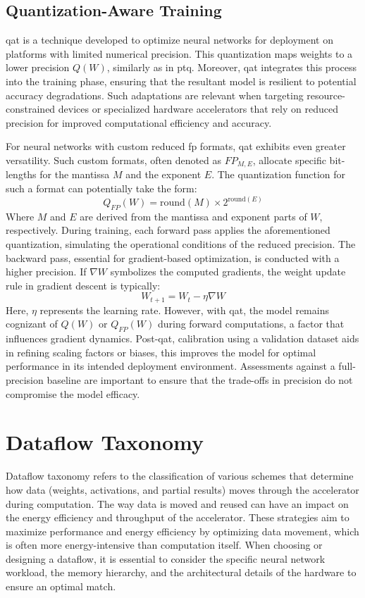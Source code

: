 \subsection{Quantization-Aware Training}

\gls{qat} is a technique developed to optimize neural networks for deployment on platforms with limited numerical precision. This quantization maps weights to a lower precision \( Q(W) \), similarly as in \gls{ptq}. Moreover, \gls{qat} integrates this process into the training phase, ensuring that the resultant model is resilient to potential accuracy degradations. Such adaptations are relevant when targeting resource-constrained devices or specialized hardware accelerators that rely on reduced precision for improved computational efficiency and accuracy.

For neural networks with custom reduced \gls{fp} formats, \gls{qat} exhibits even greater versatility. Such custom formats, often denoted as \( FP_{M,E} \), allocate specific bit-lengths for the mantissa \( M \) and the exponent \( E \). The quantization function for such a format can potentially take the form:
\begin{equation}
Q_{FP}(W) = \text{round}\left(M\right) \times 2^{\text{round}\left(E\right)}
\end{equation}
Where \( M \) and \( E \) are derived from the mantissa and exponent parts of \( W \), respectively.
During training, each forward pass applies the aforementioned quantization, simulating the operational conditions of the reduced precision. The backward pass, essential for gradient-based optimization, is conducted with a higher precision. If \( \nabla W \) symbolizes the computed gradients, the weight update rule in gradient descent is typically:
\begin{equation}
W_{t+1} = W_t - \eta \nabla W
\end{equation}
Here, \( \eta \) represents the learning rate. However, with \gls{qat}, the model remains cognizant of \( Q(W) \) or \( Q_{FP}(W) \) during forward computations, a factor that influences gradient dynamics. Post-\gls{qat}, calibration using a validation dataset aids in refining scaling factors or biases, this improves the model for optimal performance in its intended deployment environment. Assessments against a full-precision baseline are important to ensure that the trade-offs in precision do not compromise the model efficacy.


\section{Dataflow Taxonomy}
Dataflow taxonomy refers to the classification of various schemes that determine how data (weights, activations, and partial results) moves through the accelerator during computation. The way data is moved and reused can have an impact on the energy efficiency and throughput of the accelerator. These strategies aim to maximize performance and energy efficiency by optimizing data movement, which is often more energy-intensive than computation itself. When choosing or designing a dataflow, it is essential to consider the specific neural network workload, the memory hierarchy, and the architectural details of the hardware to ensure an optimal match.

